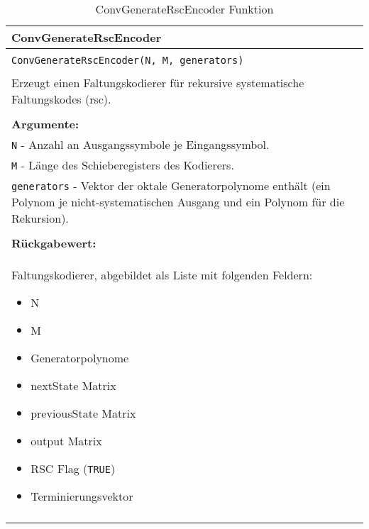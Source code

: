 \begin{longtable}{|p{\textwidth}|}
\hline
\rowcolor{lightblue}
ConvGenerateRscEncoder
\\
\hline
\\
\texttt{ConvGenerateRscEncoder(N, M, generators)}\\
\\
Erzeugt einen Faltungskodierer für rekursive systematische Faltungskodes (rsc).\\
\\
\textbf{Argumente:}\\
\texttt{N} - Anzahl an Ausgangssymbole je Eingangssymbol.\\
\texttt{M} - Länge des Schieberegisters des Kodierers.\\
\texttt{generators} - Vektor der oktale Generatorpolynome enthält (ein Polynom je nicht-systematischen Ausgang und ein Polynom für die Rekursion).\\
\\
\textbf{Rückgabewert:}\\
Faltungskodierer, abgebildet als Liste mit folgenden Feldern:
\vspace{-4mm}
\begin{itemize}
\renewcommand\labelitemi{--}
\itemsep-.5em %
\item N
\item M
\item Generatorpolynome
\item nextState Matrix
\item previousState Matrix
\item output Matrix
\item RSC Flag (\texttt{TRUE})
\item Terminierungsvektor
\end{itemize}
\\
\hline
\caption{ConvGenerateRscEncoder Funktion}
\end{longtable}